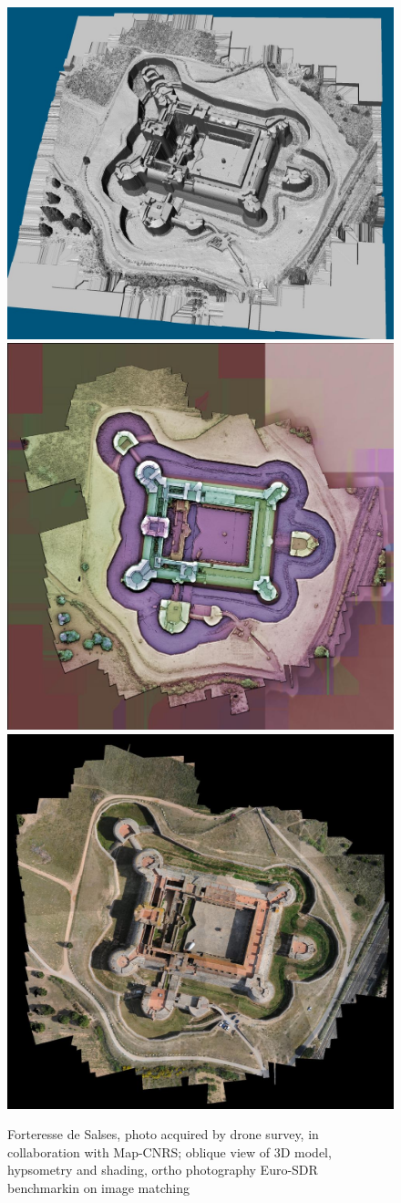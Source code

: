 \begin{figure}
\includegraphics[width=90 mm]{FIGS/SAMPLES/SlsMNE_1_25.jpg}
\includegraphics[width=90 mm]{FIGS/SAMPLES/Salse2.jpg}
\includegraphics[width=90 mm]{FIGS/SAMPLES/Ortho-Test-Redr.jpg}
\caption{Forteresse de Salses, photo acquired by drone survey, in collaboration
with Map-CNRS; oblique view of 3D model, hypsometry and shading, ortho photography
Euro-SDR benchmarkin on image matching}
\end{figure}



